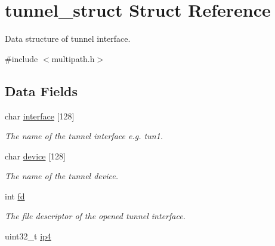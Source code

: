 \hypertarget{structtunnel__struct}{\section{tunnel\-\_\-struct Struct Reference}
\label{structtunnel__struct}
}


Data structure of tunnel interface.  




{\ttfamily \#include $<$multipath.\-h$>$}

\subsection*{Data Fields}
\begin{DoxyCompactItemize}
\item 
\hypertarget{structtunnel__struct_a5041981a03224a1f39d7ecab10cd2d4a}{char \hyperlink{structtunnel__struct_a5041981a03224a1f39d7ecab10cd2d4a}{interface} \mbox{[}128\mbox{]}}\label{structtunnel__struct_a5041981a03224a1f39d7ecab10cd2d4a}

\begin{DoxyCompactList}\small\item\em The name of the tunnel interface e.\-g. tun1. \end{DoxyCompactList}\item 
\hypertarget{structtunnel__struct_a65e722fc57875e9ed6c742f77e311edf}{char \hyperlink{structtunnel__struct_a65e722fc57875e9ed6c742f77e311edf}{device} \mbox{[}128\mbox{]}}\label{structtunnel__struct_a65e722fc57875e9ed6c742f77e311edf}

\begin{DoxyCompactList}\small\item\em The name of the tunnel device. \end{DoxyCompactList}\item 
\hypertarget{structtunnel__struct_a6f8059414f0228f0256115e024eeed4b}{int \hyperlink{structtunnel__struct_a6f8059414f0228f0256115e024eeed4b}{fd}}\label{structtunnel__struct_a6f8059414f0228f0256115e024eeed4b}

\begin{DoxyCompactList}\small\item\em The file descriptor of the opened tunnel interface. \end{DoxyCompactList}\item 
\hypertarget{structtunnel__struct_ab2ac0561b28e2a78f94b37ca5a3b2279}{uint32\-\_\-t \hyperlink{structtunnel__struct_ab2ac0561b28e2a78f94b37ca5a3b2279}{ip4}}\label{structtunnel__struct_ab2ac0561b28e2a78f94b37ca5a3b2279}


\end{DoxyCompactItemize}
